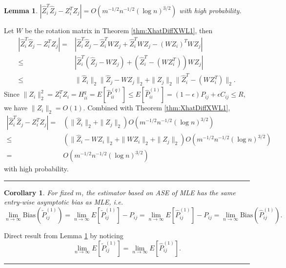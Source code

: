 \documentclass[a4paper]{article}
\newenvironment{proof}{{\bf Proof:  }}{\hfill\rule{2mm}{2mm}}
\newtheorem{lemma}[fact]{Lemma}
\newtheorem{corollary}[fact]{Corollary}
\begin{document}
\begin{lemma}
\label{lemma:1stMomentPhatDiffL1}
$\left|  \hat{Z}_i^T \hat{Z}_j - Z_i^T Z_j \right| = O(m^{-1/2} n^{-1/2} (\log n)^{3/2})$ with high probability.
\end{lemma}
\begin{proof}
Let $W$ be the rotation matrix in Theorem \ref{thm:XhatDiffXWL1}, then
\begin{align*}
	\left|  \hat{Z}_i^T \hat{Z}_j - Z_i^T Z_j \right|
    = & \left| \hat{Z}_i^T \hat{Z}_j - \hat{Z}_i^T W Z_j + \hat{Z}_i^T W Z_j - (W Z_i)^T W Z_j \right| \\
    \le & \left| \hat{Z}_i^T (\hat{Z}_j - W Z_j) + (\hat{Z}_i^T - (W Z_i^T)) W Z_j \right| \\
    \le & \|\hat{Z}_i\|_2 \|\hat{Z}_j - W Z_j\|_2 + \|Z_j\|_2 \|\hat{Z}_i^T - (W Z_i^T)\|_2.
\end{align*}
Since $\|Z_i\|_2^2 = Z_i^T Z_i = H^{q}_{ii} = E[\hat{P}^{(q)}_{ii}] \le E[\hat{P}^{(1)}_{ii}] = (1-\epsilon) P_{ij} + \epsilon C_{ij} \le R$, we have $\|Z_i\|_2 = O(1)$.
Combined with Theorem \ref{thm:XhatDiffXWL1},
\begin{align*}
    \left|  \hat{Z}_i^T \hat{Z}_j - Z_i^T Z_j \right|
    = & (\|\hat{Z}_i\|_2 + \|Z_j\|_2) O(m^{-1/2} n^{-1/2} (\log n)^{3/2}) \\
    \le & (\|\hat{Z}_i - W Z_i\|_2 + \|W Z_i\|_2 + \|Z_j\|_2) O(m^{-1/2} n^{-1/2} (\log n)^{3/2}) \\
    = & O(m^{-1/2} n^{-1/2} (\log n)^{3/2})
\end{align*}
with high probability.
\end{proof}




\begin{corollary}
\label{cor:L1Consistent}
For fixed $m$, the estimator based on ASE of MLE has the same entry-wise asymptotic bias as MLE, i.e.
\[
	\lim_{n \to \infty} \mathrm{Bias}(\widetilde{P}_{ij}^{(1)}) = \lim_{n \to \infty} E[\widetilde{P}_{ij}^{(1)}] - P_{ij} = \lim_{n \to \infty} E[\hat{P}^{(1)}_{ij}] - P_{ij}
    = \lim_{n \to \infty} \mathrm{Bias}(\hat{P}_{ij}^{(1)}).
\]
\end{corollary}
\begin{proof}
Direct result from Lemma \ref{lemma:1stMomentPhatDiffL1} by noticing
\[
	\lim_{n \to \infty} E[\widetilde{P}_{ij}^{(1)}] = \lim_{n \to \infty} E[\hat{P}^{(1)}_{ij}].
\]
\end{proof}
\end{document}
